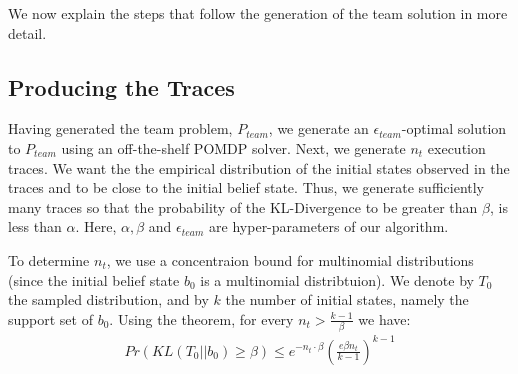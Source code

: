 \documentclass[letterpaper]{article}
\theoremstyle{definition}
\newcommand{\eliran}[1]{\textbf{[\color{red}ELIRAN:#1]}}
\begin{document}
We now explain the steps that follow the generation of the team solution in more detail.


\subsection{Producing the Traces}

Having generated the team problem, $P_{team}$, 
we generate an $\epsilon_{team}$-optimal solution
to $P_{team}$ using an off-the-shelf POMDP solver. Next, we generate
$n_t$ execution traces.
We want the the empirical distribution of the initial states observed in the traces and to be close to the
initial belief state. Thus, we generate sufficiently many traces so that the probability of the KL-Divergence to be greater than $\beta$, is less than $\alpha$. Here,  $\alpha, \beta$ and $\epsilon_{team}$ are hyper-parameters of our algorithm.


To determine $n_t$, we use a concentraion bound for multinomial distributions~\cite{KLDIV} (since the initial belief state $b_0$ is a multinomial distribtuion). We denote by $T_0$ the sampled distribution, and by $k$ the number of initial states, namely the support set of $b_0$. Using the theorem, for every $n_t > \frac{k-1}{\beta}$ we have:
\begin{align*}
    Pr(KL(T_0 || b_0) \geq \beta) \leq e^{-n_t \cdot \beta} \left( \frac{e \beta n_t}{k-1}\right)^{k-1}
\end{align*}
\end{document}
